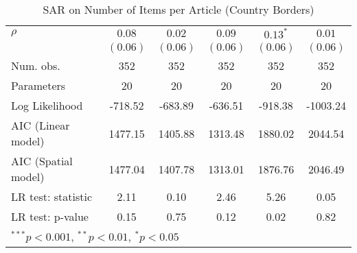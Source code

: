 \begin{table}[!h]
\begin{center}
\begin{tabular}{l c c c c c }
$\rho$                  & $0.08$       & $0.02$        & $0.09$       & $0.13^{*}$    & $0.01$       \\
                        & $(0.06)$     & $(0.06)$      & $(0.06)$     & $(0.06)$      & $(0.06)$     \\
\midrule
Num. obs.               & 352          & 352           & 352          & 352           & 352          \\
Parameters              & 20           & 20            & 20           & 20            & 20           \\
Log Likelihood          & -718.52      & -683.89       & -636.51      & -918.38       & -1003.24     \\
AIC (Linear model)      & 1477.15      & 1405.88       & 1313.48      & 1880.02       & 2044.54      \\
AIC (Spatial model)     & 1477.04      & 1407.78       & 1313.01      & 1876.76       & 2046.49      \\
LR test: statistic      & 2.11         & 0.10          & 2.46         & 5.26          & 0.05         \\
LR test: p-value        & 0.15         & 0.75          & 0.12         & 0.02          & 0.82         \\
\bottomrule
\multicolumn{6}{l}{\scriptsize{$^{***}p<0.001$, $^{**}p<0.01$, $^*p<0.05$}}
\end{tabular}
\caption{SAR on Number of Items per Article (Country Borders)}
\label{table:coefficients}
\end{center}
\end{table}

